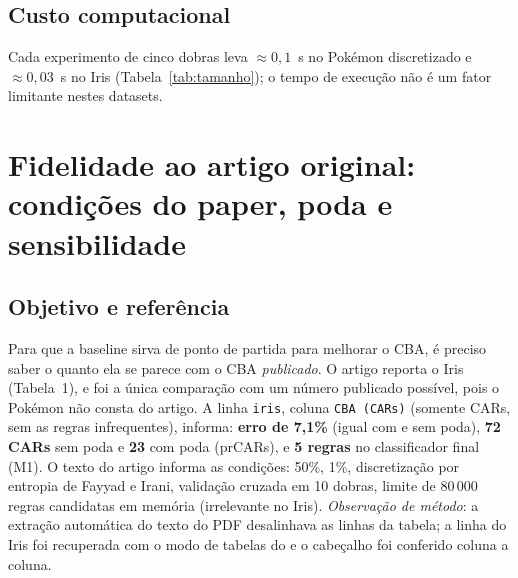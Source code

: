 \documentclass[a4paper,11pt]{article}
\newcommand{\code}[1]{\texttt{\detokenize{#1}}}
\begin{document}
\subsection{Custo computacional}
Cada experimento de cinco dobras leva $\approx 0{,}1$~s no Pok\'emon discretizado e $\approx 0{,}03$~s no Iris (Tabela~\ref{tab:tamanho}); o tempo de execu\c{c}\~ao n\~ao \'e um fator limitante nestes datasets.

\section{Fidelidade ao artigo original: condições do paper, poda e sensibilidade}\label{sec:fidelidade}

\subsection{Objetivo e referência}
Para que a baseline sirva de ponto de partida para melhorar o CBA, é preciso saber o quanto ela se parece com o CBA \emph{publicado}. O artigo reporta o Iris (Tabela~1), e foi a única comparação com um número publicado possível, pois o Pokémon não consta do artigo. A linha \texttt{iris}, coluna \texttt{CBA (CARs)} (somente CARs, sem as regras infrequentes), informa: \textbf{erro de 7,1\%} (igual com e sem poda), \textbf{72 CARs} sem poda e \textbf{23} com poda (prCARs), e \textbf{5 regras} no classificador final (M1). O texto do artigo informa as condições: \code{minconf} 50\%, \code{minsup} 1\%, discretização por entropia de Fayyad e Irani, validação cruzada em 10 dobras, limite de 80\,000 regras candidatas em memória (irrelevante no Iris). \emph{Observação de método}: a extração automática do texto do PDF desalinhava as linhas da tabela; a linha do Iris foi recuperada com o modo de tabelas do \code{pdftotext} e o cabeçalho foi conferido coluna a coluna.
\end{document}
